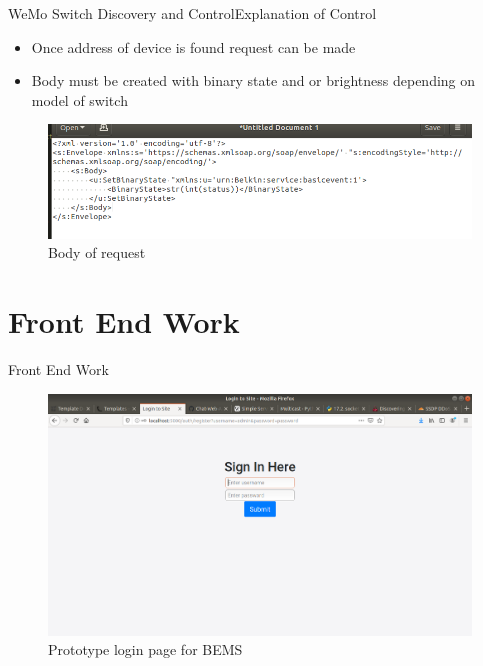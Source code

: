 \documentclass{beamer}
\begin{document}
\begin{frame}{WeMo Switch Discovery and Control}{Explanation of Control}
\begin{itemize}
\item Once address of device is found request can be made
\item Body must be created with binary state and or brightness depending on model of switch
\end{itemize}
\begin{figure}
\includegraphics[scale=0.3]{../figs/img/soapRequestWeMO}
\caption{Body of request}
\end{figure}
\end{frame}

\section{Front End Work}
\begin{frame}{Front End Work}{}
\begin{figure}
\includegraphics[scale=0.25]{../figs/img/signInPage}
\caption{Prototype login page for BEMS}
\end{figure}
\end{frame}
\end{document}
